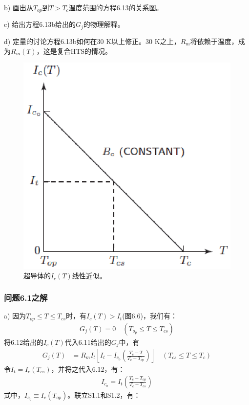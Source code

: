 b) 画出从$T_{op}$到$T>T_c$温度范围的方程6.13的关系图。

c) 给出方程6.13b给出的$G_j$的物理解释。

d) 定量的讨论方程6.13b如何在30 K以上修正。30 K之上，$R_m$将依赖于温度，成为$R_m(T)$，这是复合HTS的情况。

\begin{figure}[htbp]
	\centering
	\includegraphics[scale=0.6]{chpt6/figs/fig6.6.eps}
	\caption{超导体的$I_c(T)$线性近似。}
\end{figure}

\subsubsection{问题6.1之解}
a) 因为$T_{op}\le T\le T_{cs}$时，有$I_c(T)>I_t$(图6.6)，我们有：
\begin{align*}
G_j(T)=0 \quad (T_{o_p}\leq T \leq T_{cs}) \tag{6.13a}
\end{align*}
将6.12给出的$I_c(T)$代入6.11给出的$G_j$中，有
\begin{align*}
G_j(T)&=R_m I_t[I_t-I_{c_o} \left(\frac{T_c-T}{T_c-T_{op}}\right)]\quad (T_{cs}\leq T\leq T_c) \tag{S1.1}
\end{align*}
令$I_t=I_c(T_{cs})$，并将之代入6.12，有：
\begin{align*}%
I_{c_o}=I_t\left(\frac{T_c-T_{op} }{T_c-T_{cs}}\right) \tag{S1.2}
\end{align*}
式中，$I_{c_o}\equiv I_c(T_{op})$。联立S1.1和S1.2，有：

